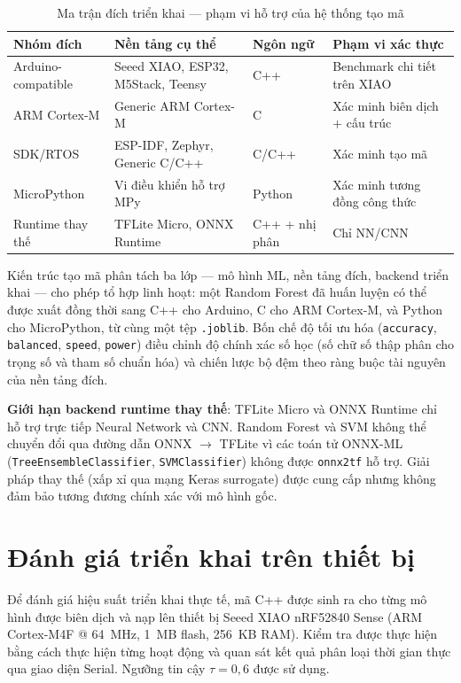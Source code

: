 \begin{table}[H]
    \centering
    \caption{Ma trận đích triển khai --- phạm vi hỗ trợ của hệ thống tạo mã}
    \label{tab:deployment_matrix}
    \small
    \begin{tabular}{@{}p{2.8cm}p{3.5cm}p{2.0cm}p{4.0cm}@{}}
        \toprule
        Nhóm đích & Nền tảng cụ thể & Ngôn ngữ & Phạm vi xác thực \\
        \midrule
        Arduino-compatible & Seeed XIAO, ESP32, M5Stack, Teensy & C++ & Benchmark chi tiết trên XIAO \\
        ARM Cortex-M & Generic ARM Cortex-M & C & Xác minh biên dịch + cấu trúc \\
        SDK/RTOS & ESP-IDF, Zephyr, Generic C/C++ & C/C++ & Xác minh tạo mã \\
        MicroPython & Vi điều khiển hỗ trợ MPy & Python & Xác minh tương đồng công thức \\
        Runtime thay thế & TFLite Micro, ONNX Runtime & C++ + nhị phân & Chỉ NN/CNN \\
        \bottomrule
    \end{tabular}
\end{table}

Kiến trúc tạo mã phân tách ba lớp --- mô hình ML, nền tảng đích, backend triển khai --- cho phép tổ hợp linh hoạt: một Random Forest đã huấn luyện có thể được xuất đồng thời sang C++ cho Arduino, C cho ARM Cortex-M, và Python cho MicroPython, từ cùng một tệp \texttt{.joblib}. Bốn chế độ tối ưu hóa (\texttt{accuracy}, \texttt{balanced}, \texttt{speed}, \texttt{power}) điều chỉnh độ chính xác số học (số chữ số thập phân cho trọng số và tham số chuẩn hóa) và chiến lược bộ đệm theo ràng buộc tài nguyên của nền tảng đích.

\textbf{Giới hạn backend runtime thay thế}: TFLite Micro và ONNX Runtime chỉ hỗ trợ trực tiếp Neural Network và CNN. Random Forest và SVM không thể chuyển đổi qua đường dẫn ONNX $\to$ TFLite vì các toán tử ONNX-ML (\texttt{TreeEnsembleClassifier}, \texttt{SVMClassifier}) không được \texttt{onnx2tf} hỗ trợ. Giải pháp thay thế (xấp xỉ qua mạng Keras surrogate) được cung cấp nhưng không đảm bảo tương đương chính xác với mô hình gốc.

\section{Đánh giá triển khai trên thiết bị}
\label{sec:device_benchmark}

Để đánh giá hiệu suất triển khai thực tế, mã C++ được sinh ra cho từng mô hình được biên dịch và nạp lên thiết bị Seeed XIAO nRF52840 Sense (ARM Cortex-M4F @ 64~MHz, 1~MB flash, 256~KB RAM). Kiểm tra được thực hiện bằng cách thực hiện từng hoạt động và quan sát kết quả phân loại thời gian thực qua giao diện Serial. Ngưỡng tin cậy $\tau = 0{,}6$ được sử dụng.

